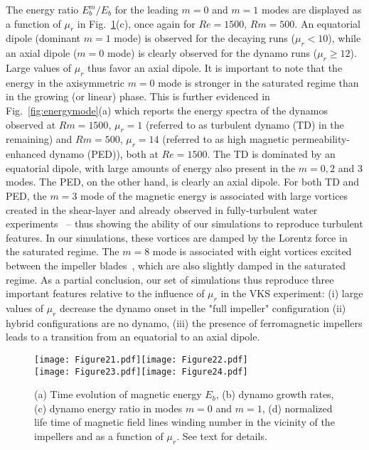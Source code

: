 \documentclass[aps,prl,twocolumn,showpacs,amsmath,amssymb]{revtex4-1}%
\begin{document}
The energy ratio $E_b^m/E_b$ for the leading $m=0$ and $m=1$ modes are displayed as a function of $\mu_r$ in Fig.~\ref{fig:growthofmagneticfield}(c), 
once again for $Re=1500$, $Rm=500$. An equatorial dipole (dominant $m=1$ mode) is observed for the decaying runs ($\mu_r<10$), while an axial dipole ($m=0$ mode) is clearly observed for the dynamo runs ($\mu_r \geq 12$). Large values of $\mu_r$ thus favor an axial dipole. It is important to note that the energy in the axisymmetric $m=0$ mode is stronger in the saturated regime than in the growing (or linear) phase.  This is further evidenced in Fig.~\ref{fig:energymode}(a) which reports the energy spectra of the dynamos observed at $Rm=1500$, $\mu_r=1$ (referred to as turbulent dynamo (TD) in the remaining) and $Rm=500$, $\mu_r = 14$ (referred to as high magnetic permeability-enhanced dynamo (PED)), both at $Re=1500$. The TD is dominated by an equatorial dipole, with large amounts of energy also present in the $m=0,2$ and 3 modes. 
The PED, on the other hand, is clearly an axial dipole.    
For both TD and PED, the $m=3$ mode of the magnetic energy is associated with large vortices created in the shear-layer and already observed in fully-turbulent water experiments~\cite{paper:delatorre:2007,cortet_normalized_2009} -- thus showing the ability of our simulations to reproduce turbulent features. In our simulations, these vortices are  damped by the Lorentz force in the saturated regime.
The $m=8$ mode is associated with eight vortices excited between the impeller blades~\cite{paper:kreuzahler:2014}, which are also slightly damped in the saturated regime. 
As a partial conclusion, our set of simulations thus reproduce three important features relative to the influence of $\mu_r$ in the VKS experiment: (i) large values of $\mu_r$ decrease the dynamo onset in the "full impeller" configuration (ii) hybrid configurations are no dynamo, (iii) the presence of ferromagnetic impellers leads to a transition from an equatorial to an axial dipole. 



\begin{figure}
\texttt{[image: Figure21.pdf]}\texttt{[image: Figure22.pdf]}\\
\texttt{[image: Figure23.pdf]}\texttt{[image: Figure24.pdf]}
\caption{(a) Time evolution of magnetic energy $E_b$, (b) dynamo growth rates, (c) dynamo energy ratio in modes $m=0$ and $m=1$, (d) normalized life time of magnetic field lines winding number in the vicinity of the impellers and as a function of $\mu_r$. See text for details.}
\label{fig:growthofmagneticfield}
\end{figure}
\end{document}
